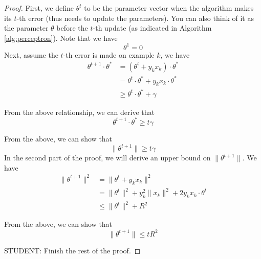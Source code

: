 \documentclass[12pt]{article}
\begin{document}
\begin{proof}
First, we define $\theta^t$ to be the parameter vector  when the algorithm makes its $t$-th error (thus needs to update the parameters). You can also think of it as the parameter $\theta$ before the $t$-th update (as indicated in Algorithm \ref{alg:perceptron}). Note that we have 
\begin{equation}
    \theta^1 =0
    \label{equ:1}
\end{equation}
Next, assume the $t$-th error is made on example $k$, we have
\begin{align}
    \theta^{t+1}\cdot \theta^*&=(\theta^{t}+y_kx_k)\cdot \theta^*\label{equ:2}\\
    &=\theta^{t}\cdot \theta^*+y_kx_k\cdot \theta^*\\
    &\geq \theta^{t}\cdot \theta^*+\gamma \label{equ:3}
\end{align}

From the above relationship,  we can derive that
\begin{equation}
    \theta^{t+1}\cdot \theta^*\geq t\gamma
    \label{equ:4}
\end{equation}

From the above, we can show that
\begin{equation}
    \|\theta^{t+1}\|\geq t\gamma\label{equ:cauchy}
\end{equation}
In the second part of the proof, we will derive an upper bound on $\|\theta^{t+1}\|$. We have
\begin{align}
    \|\theta^{t+1}\|^2&=\|\theta^{t}+y_kx_k\|^2\label{equ:5}\\
    &= \|\theta^{t}\|^2+y_k^2\|x_k\|^2+2y_kx_k\cdot \theta^t\\
    &\leq \|\theta^{t}\|^2+R^2\label{equ:6}
\end{align}

From the above, we can show that 
\begin{equation}
    \|\theta^{t+1}\|\leq tR^2\label{equ:7}
\end{equation}

STUDENT: Finish the rest of the proof.
\end{proof}
\end{document}
